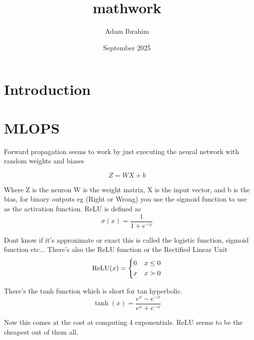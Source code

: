 \documentclass{article}
\title{mathwork}
\author{Adam Ibrahim}
\date{September 2025}
\begin{document}
\maketitle

\section{Introduction}
\section{MLOPS}
\par{Forward propagation seems to work by just executing the neural network with random weights and biases}

$$ Z=WX+b$$
\par {Where Z is the neuron W is the weight matrix, X is the input vector, and b is the bias, for binary outputs eg (Right or Wrong) you use the sigmoid function to use as the activation function. ReLU is defined as}
$$\sigma(x) = \frac{1}{1+e^{-x}}$$
\par{Dont know if it's approximate or exact this is called the logistic function, sigmoid function etc... There's also the ReLU function or the Rectified Linear Unit}\\

$$\text{ReLU}(x) = \begin{dcases}0 & x\leq0 \\ x & x > 0\end{dcases}$$
\par{There's the tanh function which is short for tan hyperbolic.}
$$\tanh(x) = \frac{e^x-e^{-x}}{e^x+e^{-x}}$$
\par{Now this comes at the cost at computing 4 exponentials. ReLU seems to be the 
cheapest out of them all.}\\
\end{document}
